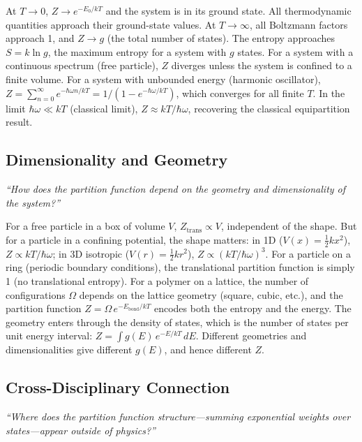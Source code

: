 At $T \to 0$, $Z \to e^{-E_{0}/kT}$ and the system is in its ground state. All thermodynamic quantities approach their ground-state values. At $T \to \infty$, all Boltzmann factors approach 1, and $Z \to g$ (the total number of states). The entropy approaches $S = k\ln g$, the maximum entropy for a system with $g$ states. For a system with a continuous spectrum (free particle), $Z$ diverges unless the system is confined to a finite volume. For a system with unbounded energy (harmonic oscillator), $Z = \sum_{n=0}^{\infty} e^{-\hbar\omega n/kT} = 1/(1 - e^{-\hbar\omega/kT})$, which converges for all finite $T$. In the limit $\hbar\omega \ll kT$ (classical limit), $Z \approx kT/\hbar\omega$, recovering the classical equipartition result.

\subsection*{Dimensionality and Geometry}
\textit{``How does the partition function depend on the geometry and dimensionality of the system?''}

For a free particle in a box of volume $V$, $Z_{\text{trans}} \propto V$, independent of the shape. But for a particle in a confining potential, the shape matters: in 1D ($V(x) = \frac{1}{2}kx^{2}$), $Z \propto kT/\hbar\omega$; in 3D isotropic ($V(r) = \frac{1}{2}kr^{2}$), $Z \propto (kT/\hbar\omega)^{3}$. For a particle on a ring (periodic boundary conditions), the translational partition function is simply 1 (no translational entropy). For a polymer on a lattice, the number of configurations $\Omega$ depends on the lattice geometry (square, cubic, etc.), and the partition function $Z = \Omega\,e^{-E_{\text{bond}}/kT}$ encodes both the entropy and the energy. The geometry enters through the density of states, which is the number of states per unit energy interval: $Z = \int g(E)\,e^{-E/kT}\,dE$. Different geometries and dimensionalities give different $g(E)$, and hence different $Z$.

\subsection*{Cross-Disciplinary Connection}
\textit{``Where does the partition function structure---summing exponential weights over states---appear outside of physics?''}

